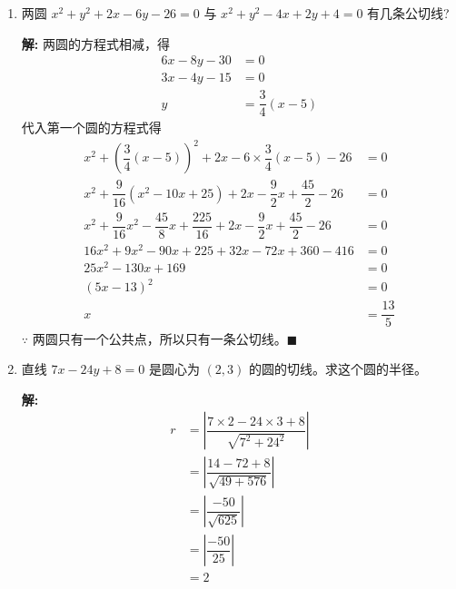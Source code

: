 \documentclass[10pt]{article}
\newcommand{\sol}{\textbf{解:} }
\begin{document}
\begin{enumerate}[leftmargin=*]
        \newpage
  \item 两圆 $x^{2}+y^{2}+2 x-6 y-26=0$ 与 $x^{2}+y^{2}-4 x+2 y+4=0$ 有几条公切线?

        \sol{}
        两圆的方程式相减，得
        \begin{align*}
          6x - 8y - 30 & = 0                   \\
          3x - 4y - 15 & = 0                   \\
          y            & = \dfrac{3}{4}(x - 5)
        \end{align*}
        代入第一个圆的方程式得
        \begin{align*}
          x^{2} + \left(\dfrac{3}{4}(x - 5)\right)^{2} + 2x - 6 \times \dfrac{3}{4}(x - 5) - 26                   & = 0             \\
          x^{2} + \dfrac{9}{16}(x^{2} - 10x + 25) + 2x - \dfrac{9}{2}x + \dfrac{45}{2} - 26                       & = 0             \\
          x^{2} + \dfrac{9}{16}x^{2} - \dfrac{45}{8}x + \dfrac{225}{16} + 2x - \dfrac{9}{2}x + \dfrac{45}{2} - 26 & = 0             \\
          16x^{2} + 9x^{2} - 90x + 225 + 32x - 72x + 360 - 416                                                    & = 0             \\
          25x^{2} - 130x + 169                                                                                    & = 0             \\
          (5x - 13)^{2}                                                                                           & = 0             \\
          x                                                                                                       & = \dfrac{13}{5}
        \end{align*}
        $\because$ 两圆只有一个公共点，所以只有一条公切线。\hfill$\blacksquare$

  \item 直线 $7 x-24 y+8=0$ 是圆心为 $(2,3)$ 的圆的切线。求这个圆的半径。

        \sol{}
        \begin{align*}
          r & = \left\vert \dfrac{7 \times 2 - 24 \times 3 + 8}{\sqrt{7^{2} + 24^{2}}} \right\vert \\
            & = \left\vert \dfrac{14 - 72 + 8}{\sqrt{49 + 576}} \right\vert                        \\
            & = \left\vert \dfrac{-50}{\sqrt{625}} \right\vert                                     \\
            & = \left\vert \dfrac{-50}{25} \right\vert                                             \\
            & = 2
        \end{align*}


\end{enumerate}
\end{document}
